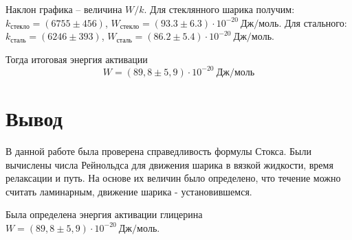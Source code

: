 \documentclass[12pt,a4paper]{article}
\begin{document}
\begin{enumerate}
\begin{figure}[h!]
\end{figure}

Наклон графика -- величина $W/k$. Для стеклянного шарика получим: $k_{стекло} = (6755 \pm 456)$, $W_{стекло} = (93.3 \pm 6.3) \cdot 10^{-20} \: Дж/моль$. Для стального: $k_{сталь} = (6246 \pm 393)$, $W_{сталь} = (86.2 \pm 5.4) \cdot 10^{-20} \: Дж/моль$.

Тогда итоговая энергия активации $$W=(89,8 \pm 5,9) \cdot 10^{-20} \: Дж/моль$$

\section{Вывод}

В данной работе была проверена справедливость формулы Стокса. Были вычислены числа Рейнольдса для движения шарика в вязкой жидкости, время релаксации и путь. На основе их величин было определено, что течение можно считать ламинарным, движение шарика - установившемся.

Была определена энергия активации глицерина $W = (89,8 \pm 5,9) \cdot 10^{-20} \: Дж/моль$.

\end{enumerate}
\end{document}
